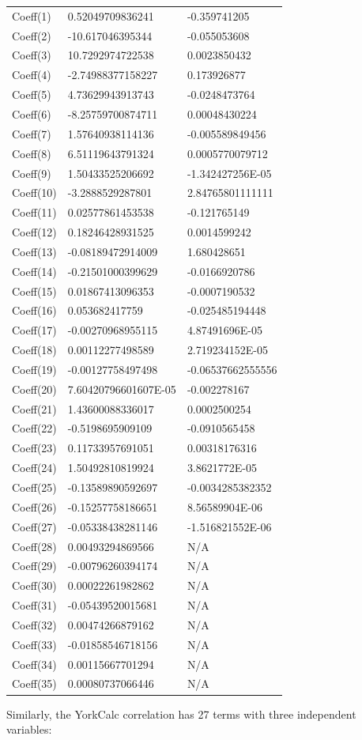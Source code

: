 \begin{longtable}[c]{p{2.0in}p{2.0in}p{2.0in}}
Coeff(1) & 0.52049709836241 & -0.359741205 \tabularnewline
Coeff(2) & -10.617046395344 & -0.055053608 \tabularnewline
Coeff(3) & 10.7292974722538 & 0.0023850432 \tabularnewline
Coeff(4) & -2.74988377158227 & 0.173926877 \tabularnewline
Coeff(5) & 4.73629943913743 & -0.0248473764 \tabularnewline
Coeff(6) & -8.25759700874711 & 0.00048430224 \tabularnewline
Coeff(7) & 1.57640938114136 & -0.005589849456 \tabularnewline
Coeff(8) & 6.51119643791324 & 0.0005770079712 \tabularnewline
Coeff(9) & 1.50433525206692 & -1.342427256E-05 \tabularnewline
Coeff(10) & -3.2888529287801 & 2.84765801111111 \tabularnewline
Coeff(11) & 0.02577861453538 & -0.121765149 \tabularnewline
Coeff(12) & 0.18246428931525 & 0.0014599242 \tabularnewline
Coeff(13) & -0.08189472914009 & 1.680428651 \tabularnewline
Coeff(14) & -0.21501000399629 & -0.0166920786 \tabularnewline
Coeff(15) & 0.01867413096353 & -0.0007190532 \tabularnewline
Coeff(16) & 0.053682417759 & -0.025485194448 \tabularnewline
Coeff(17) & -0.00270968955115 & 4.87491696E-05 \tabularnewline
Coeff(18) & 0.00112277498589 & 2.719234152E-05 \tabularnewline
Coeff(19) & -0.00127758497498 & -0.06537662555556 \tabularnewline
Coeff(20) & 7.60420796601607E-05 & -0.002278167 \tabularnewline
Coeff(21) & 1.43600088336017 & 0.0002500254 \tabularnewline
Coeff(22) & -0.5198695909109 & -0.0910565458 \tabularnewline
Coeff(23) & 0.11733957691051 & 0.00318176316 \tabularnewline
Coeff(24) & 1.50492810819924 & 3.8621772E-05 \tabularnewline
Coeff(25) & -0.13589890592697 & -0.0034285382352 \tabularnewline
Coeff(26) & -0.15257758186651 & 8.56589904E-06 \tabularnewline
Coeff(27) & -0.05338438281146 & -1.516821552E-06 \tabularnewline
Coeff(28) & 0.00493294869566 & N/A \tabularnewline
Coeff(29) & -0.00796260394174 & N/A \tabularnewline
Coeff(30) & 0.00022261982862 & N/A \tabularnewline
Coeff(31) & -0.05439520015681 & N/A \tabularnewline
Coeff(32) & 0.00474266879162 & N/A \tabularnewline
Coeff(33) & -0.01858546718156 & N/A \tabularnewline
Coeff(34) & 0.00115667701294 & N/A \tabularnewline
Coeff(35) & 0.00080737066446 & N/A \tabularnewline
\bottomrule
\end{longtable}

Similarly, the YorkCalc correlation has 27 terms with three independent variables:

